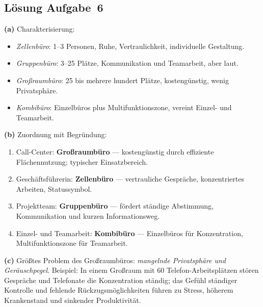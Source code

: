 \documentclass[11pt, a4paper]{article}
\begin{document}
\subsection*{Lösung Aufgabe~6}
\begin{loesung}
\textbf{(a)} Charakterisierung:
\begin{itemize}[itemsep=0pt]
  \item \emph{Zellenbüro}: 1--3 Personen, Ruhe, Vertraulichkeit, individuelle Gestaltung.
  \item \emph{Gruppenbüro}: 3--25 Plätze, Kommunikation und Teamarbeit, aber laut.
  \item \emph{Großraumbüro}: 25 bis mehrere hundert Plätze, kostengünstig, wenig Privatsphäre.
  \item \emph{Kombibüro}: Einzelbüros plus Multifunktionszone, vereint Einzel- und Teamarbeit.
\end{itemize}

\textbf{(b)} Zuordnung mit Begründung:
\begin{enumerate}[label=\arabic*., itemsep=0pt]
  \item Call-Center: \textbf{Großraumbüro} --- kostengünstig durch effiziente Flächennutzung; typischer Einsatzbereich.
  \item Geschäftsführerin: \textbf{Zellenbüro} --- vertrauliche Gespräche, konzentriertes Arbeiten, Statussymbol.
  \item Projektteam: \textbf{Gruppenbüro} --- fördert ständige Abstimmung, Kommunikation und kurzen Informationsweg.
  \item Einzel- und Teamarbeit: \textbf{Kombibüro} --- Einzelbüros für Konzentration, Multifunktionszone für Teamarbeit.
\end{enumerate}

\textbf{(c)} Größtes Problem des Großraumbüros: \emph{mangelnde Privatsphäre und
Geräuschpegel}. Beispiel: In einem Großraum mit 60 Telefon-Arbeitsplätzen stören
Gespräche und Telefonate die Konzentration ständig; das Gefühl ständiger Kontrolle und
fehlende Rückzugsmöglichkeiten führen zu Stress, höherem Krankenstand und sinkender
Produktivität.
\end{loesung}
\end{document}
